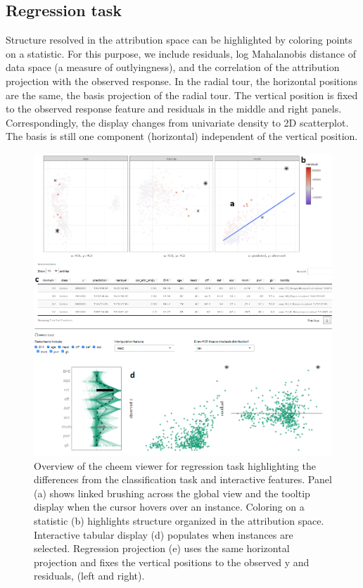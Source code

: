 \documentclass[
]{article}
\begin{document}
\hypertarget{regression-task}{%
\subsection{Regression task}\label{regression-task}}

Structure resolved in the attribution space can be highlighted by coloring points on a statistic. For this purpose, we include residuals, log Mahalanobis distance of data space (a measure of outlyingness), and the correlation of the attribution projection with the observed response. In the radial tour, the horizontal positions are the same, the basis projection of the radial tour. The vertical position is fixed to the observed response feature and residuals in the middle and right panels. Correspondingly, the display changes from univariate density to 2D scatterplot. The basis is still one component (horizontal) independent of the vertical position.

\begin{figure}

{\centering \includegraphics[width=1\linewidth]{./figures/app_regression_interactions} 

}

\caption{Overview of the cheem viewer for regression task highlighting the differences from the classification task and interactive features. Panel (a) shows linked brushing across the global view and the tooltip display when the cursor hovers over an instance. Coloring on a statistic (b) highlights structure organized in the attribution space. Interactive tabular display (d) populates when instances are selected. Regression projection (e) uses the same horizontal projection and fixes the vertical positions to the observed y and residuals, (left and right).}\label{fig:regressioncase}
\end{figure}
\end{document}

